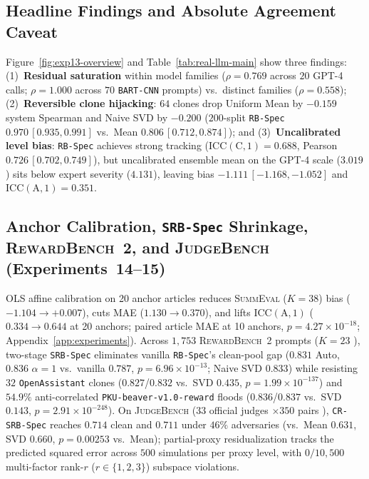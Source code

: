 \subsection{Headline Findings and Absolute Agreement Caveat}

Figure~\ref{fig:exp13-overview} and Table~\ref{tab:real-llm-main} show three findings:
(1)~\textbf{Residual saturation} within model families ($\rho = 0.769$ across $20$ GPT-4 calls; $\rho = 1.000$ across $70$ \texttt{BART-CNN} prompts) vs.\ distinct families ($\rho = 0.558$);
(2)~\textbf{Reversible clone hijacking}: $64$ clones drop Uniform Mean by $-0.159$ system Spearman and Naive SVD by $-0.200$ ($200$-split \texttt{RB-Spec} $0.970\,[0.935, 0.991]$ vs.\ Mean $0.806\,[0.712, 0.874]$); and
(3)~\textbf{Uncalibrated level bias}: \texttt{RB-Spec} achieves strong tracking ($\mathrm{ICC(C,1)}=0.688$, Pearson $0.726\,[0.702, 0.749]$), but uncalibrated ensemble mean on the GPT-4 scale ($3.019$) sits below expert severity ($4.131$), leaving bias $-1.111\,[-1.168, -1.052]$ and $\mathrm{ICC(A,1)}=0.351$.

\subsection{Anchor Calibration, \texttt{SRB-Spec} Shrinkage, \textsc{RewardBench~2}, and \textsc{JudgeBench} (Experiments~14--15)}

OLS affine calibration on 20 anchor articles reduces \textsc{SummEval} ($K=38$) bias ($-1.104 \to +0.007$), cuts MAE ($1.130 \to 0.370$), and lifts $\mathrm{ICC(A,1)}$ ($0.334 \to 0.644$ at 20 anchors; paired article MAE at 10 anchors, $p=4.27\times 10^{-18}$; Appendix~\ref{app:experiments}). Across $1,753$ \textsc{RewardBench~2} prompts ($K=23$ \citep{malik2025rewardbench2}), two-stage \texttt{SRB-Spec} eliminates vanilla \texttt{RB-Spec}'s clean-pool gap ($0.831$ Auto, $0.836$ $\alpha=1$ vs.\ vanilla $0.787$, $p=6.96\times 10^{-13}$; Naive SVD $0.833$) while resisting $32$ \texttt{OpenAssistant} clones ($0.827$/$0.832$ vs.\ SVD $0.435$, $p=1.99\times 10^{-137}$) and $54.9\%$ anti-correlated \texttt{PKU-beaver-v1.0-reward} floods ($0.836$/$0.837$ vs.\ SVD $0.143$, $p=2.91\times 10^{-248}$). On \textsc{JudgeBench} ($33$ official judges $\times 350$ pairs \citep{tan2025judgebench}), \texttt{CR-SRB-Spec} reaches $0.714$ clean and $0.711$ under $46\%$ adversaries (vs.\ Mean $0.631$, SVD $0.660$, $p=0.00253$ vs.\ Mean); partial-proxy residualization tracks the predicted squared error across $500$ simulations per proxy level, with $0/10{,}500$ multi-factor rank-$r$ ($r\in\{1,2,3\}$) subspace violations.
